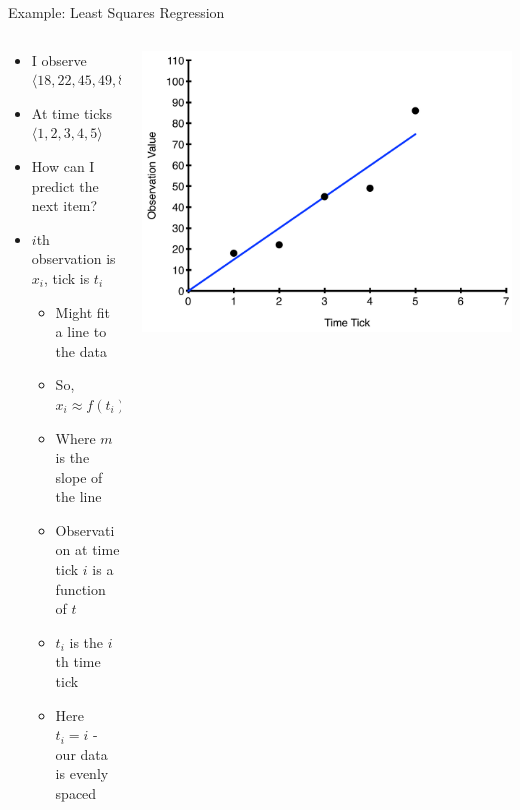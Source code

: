 \documentclass[aspectratio=169]{beamer}
\begin{document}
\begin{frame}{Example: Least Squares Regression}

\begin{columns}
\begin{column}{0.5\textwidth}
\begin{itemize}
\item I observe $\langle 18, 22, 45, 49, 86\rangle$
\item At time ticks $\langle 1, 2, 3, 4, 5\rangle$
\item How can I predict the next item?
\item $i$th observation is $x_i$, tick is $t_i$
	\begin{itemize}
		\item Might fit a line to the data
		\item So, $x_i \approx f(t_i) = m \times t_i$
		\item Where $m$ is the slope of the line
		\item Observation at time tick $i$ is a function of $t$
		\item $t_i$ is the $i$th time tick
		\item Here $t_i = i$ - our data is evenly spaced
	\end{itemize}
\end{itemize}
\end{column}
\begin{column}{0.5\textwidth}
\includegraphics[width=1\textwidth]{lectModel2/LSReg1Line.pdf}
\end{column}
\end{columns}
\end{frame}
\end{document}
